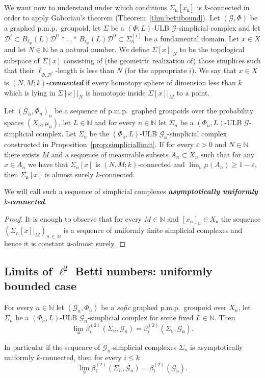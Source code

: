 \documentclass[AHL,Unicode,longabstracts,published]{cedram}
\newcommand{\defin}[1]{\textbf{\emph{#1}}}
\newcommand{\Nmath}{\mathbb{N}}
\newcommand{\cg}{\mathcal{G}}
\newcommand{\cd}{\mathcal{D}}
\newcommand{\ul}{\mathfrak{u}}
\newcommand{\eps}{\varepsilon}
\newcommand{\pmp}{p.m.p.\ }
\begin{document}
We want now to understand under which conditions $\Sigma_\ul[x_\ul]$ is $k$-connected in order to apply Gaboriau's theorem (Theorem~\ref{thm:bettibound}). Let $(\cg,\Phi)$ be a graphed \pmp groupoid, let $\Sigma$ be a $(\Phi,L)$-ULB $\cg$-simplicial complex and let $\cd^i\subset B_{\ell_\Phi}(L)\cd^0\,*\ldots*\,B_{\ell_\Phi}(L)\cd^0\subset \Sigma_n^{(i)}$ be a fundamental domain. Let $x\in X$ and let $N\in\Nmath$ be a natural number. We define $\Sigma[x]|_N$ to be the topological subspace of $\Sigma[x]$ consisting of (the geometric realization of) those simplices such that their $\ell_{\Phi,\cd^i}$-length is less than $N$ (for the appropriate $i$). We say that $x\in X$ is $(N,M;k)$-\defin{connected} if every homotopy sphere of dimension less than $k$ which is lying in $\Sigma[x]|_N$ is homotopic inside $\Sigma[x]|_M$ to a point.

\begin{prop}\label{prop:contract}
Let $(\cg_n,\Phi_n)_n$ be a sequence of \pmp graphed groupoids over the probability spaces $(X_n,\mu_n)$, let $L\in\Nmath$ and for every $n\in\Nmath$ let $\Sigma_n$ be a $(\Phi_n,L)$-ULB $\cg$-simplicial complex. Let $\Sigma_\ul$ be the $(\Phi_\ul,L)$-ULB $\cg_\ul$-simplicial complex constructed in Proposition~\ref{prop:simpliciallimit}. If for every $\eps>0$ and $N\in\Nmath$ there exists $M$ and a sequence of measurable subsets $A_n\subset X_n$ such that for any $x\in A_n$ we have that $\Sigma_n[x]$ is $(N,M;k)$-connected and $\lim_\ul\mu(A_n)\geq 1-\eps$, then $\Sigma_\ul[x]$ is almost surely $k$-connected.
\end{prop}

We will call such a sequence of simplicial complexes
\defin{asymptotically uniformly }$k$-\defin{connected}.

\begin{proof}
It is enough to observe that for every $M\in\Nmath$ and $[x_n]_\ul\in X_\ul$ the sequence $(\Sigma_n[x]|_M)_{n\,\in \,\Nmath}$ is a sequence of uniformly finite simplicial complexes and hence it is constant $\ul$-almost surely.
\end{proof}

\subsection{\texorpdfstring{Limits of $\ell^2$ Betti numbers: uniformly bounded case}{Limits of L2 Betti numbers: uniformly bounded case}}

\begin{theo}\label{thm:limitbounded}
For every $n\in\Nmath$ let $(\cg_n,\Phi_n)$ be a \emph{sofic} graphed \pmp groupoid over $X_n$, let $\Sigma_n$ be a $(\Phi_n,L)$-ULB $\cg_n$-simplicial complex for some fixed $L\in\Nmath$. Then
\[
\lim_\ul\beta^{(2)}_i\left(\Sigma_n,\cg_n\right)=\beta^{(2)}_i\left(\Sigma_\ul,\cg_\ul\right).
\]

In particular if the sequence of $\cg_n$-simplicial complexes $\Sigma_n$ is asymptotically uniformly $k$-connected, then for every $i\leq k$
\[
\lim_\ul\beta^{(2)}_i\left(\Sigma_n,\cg_n\right)=\beta^{(2)}_i(\cg_\ul).
\]
\end{theo}
\end{document}
